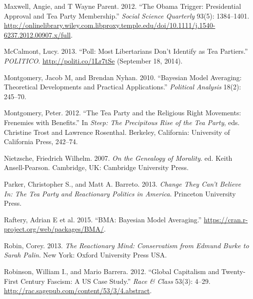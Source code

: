 \documentclass[12pt,]{article}
\begin{document}
Maxwell, Angie, and T Wayne Parent. 2012. ``The Obama Trigger:
Presidential Approval and Tea Party Membership.'' \emph{Social Science
Quarterly} 93(5): 1384--1401.
\url{http://onlinelibrary.wiley.com.libproxy.temple.edu/doi/10.1111/j.1540-6237.2012.00907.x/full}.

McCalmont, Lucy. 2013. ``Poll: Most Libertarians Don't Identify as Tea
Partiers.'' \emph{POLITICO}. \url{http://politi.co/1Lr7tSe} (September
18, 2014).

Montgomery, Jacob M, and Brendan Nyhan. 2010. ``Bayesian Model
Averaging: Theoretical Developments and Practical Applications.''
\emph{Political Analysis} 18(2): 245--70.

Montgomery, Peter. 2012. ``The Tea Party and the Religious Right
Movements: Frenemies with Benefits.'' In \emph{Steep: The Precipitous
Rise of the Tea Party}, eds. Christine Trost and Lawrence Rosenthal.
Berkeley, California: University of California Press, 242--74.

Nietzsche, Friedrich Wilhelm. 2007. \emph{On the Genealogy of Morality}.
ed. Keith Ansell-Pearson. Cambridge, UK: Cambridge University Press.

Parker, Christopher S., and Matt A. Barreto. 2013. \emph{Change They
Can't Believe In: The Tea Party and Reactionary Politics in America}.
Princeton University Press.

Raftery, Adrian E et al. 2015. ``BMA: Bayesian Model Averaging.''
\url{https://cran.r-project.org/web/packages/BMA/}.

Robin, Corey. 2013. \emph{The Reactionary Mind: Conservatism from Edmund
Burke to Sarah Palin}. New York: Oxford University Press USA.

Robinson, William I., and Mario Barrera. 2012. ``Global Capitalism and
Twenty-First Century Fascism: A US Case Study.'' \emph{Race \& Class}
53(3): 4--29. \url{http://rac.sagepub.com/content/53/3/4.abstract}.
\end{document}
